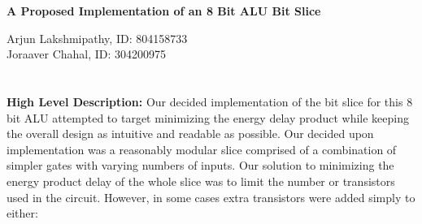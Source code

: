 \documentclass[12pt]{article}
\begin{document}
	\large \textbf{A Proposed Implementation of an 8 Bit ALU Bit Slice}
	\normalsize
	\begin{center}
		Arjun Lakshmipathy, ID: 804158733 \\
		Joraaver Chahal, ID: 304200975
	\end{center}
  \section{}

	\textbf{High Level Description:}
	\newline \newline
	Our decided implementation of the bit slice for this 8 bit ALU attempted to target
	minimizing the energy delay product while keeping the overall design as intuitive and 
	readable as possible. Our decided upon implementation was a reasonably modular 
	slice comprised of a combination of simpler gates with varying numbers of inputs. Our
	solution to minimizing the energy product delay of the whole slice was to limit the number
	or transistors used in the circuit. However, in some cases extra transistors were added
	simply to either:
	
\end{document}
